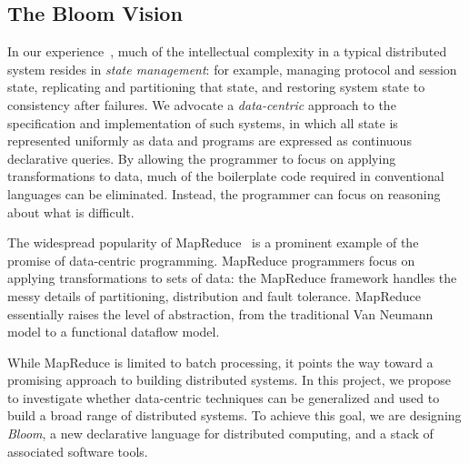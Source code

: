 \subsection{The Bloom Vision}
In our experience~\cite{boom-eurosys, netdb}, much of the intellectual
complexity in a typical distributed system resides in \emph{state
  management}: for example, managing protocol and session state, replicating and
  partitioning that state, and restoring system state to consistency after
  failures. 
We advocate a {\em data-centric\/} approach to the specification and implementation 
of such systems, in which all state is represented uniformly as data and programs
are expressed as continuous declarative queries.
By allowing the programmer to focus on applying transformations to
data, much of the boilerplate code required in conventional languages can be
eliminated. Instead, the programmer can focus on reasoning about what is
difficult.

The widespread popularity of MapReduce~\cite{mapreduce-osdi} is a prominent
example of the promise of data-centric programming. MapReduce programmers focus
on applying transformations to sets of data: the MapReduce framework handles the
messy details of partitioning, distribution and fault tolerance. MapReduce
essentially raises the level of abstraction, from the traditional Van Neumann
model to a functional dataflow model.

While MapReduce is limited to batch processing, it points the way toward a
promising approach to building distributed systems. In this project, we propose
to investigate whether data-centric techniques can be generalized and used to
build a broad range of distributed systems. To achieve this goal, we are
designing \emph{Bloom}, a new declarative language for distributed computing,
and a stack of associated software tools.
